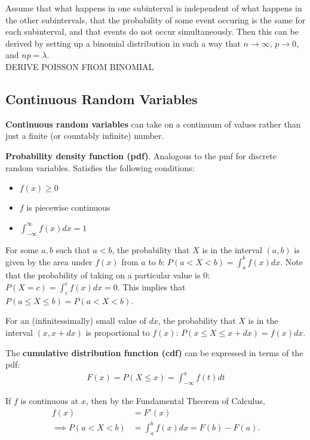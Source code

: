 \documentclass[a4paper,10pt]{article}
\begin{document}
Assume that what happens in one subinterval is independent of what happens in the other subintervals, that the probability of some event occuring is the same for each subinterval, and that events do not occur simultaneously. Then this can be derived by setting up a binomial distribution in such a way that $n \to \infty$, $p\to 0$, and $np=\lambda$. \\

{\Huge DERIVE POISSON FROM BINOMIAL} 

\subsection{Continuous Random Variables}

\textbf{Continuous random variables} can take on a continuum of values rather than just a finite (or countably infinite) number. 

\textbf{Probability density function (pdf)}. Analogous to the pmf for discrete random variables. Satisfies the following conditions:

\begin{itemize}
    \item $f(x) \geq 0$
    \item $f$ is piecewise continuous 
    \item $\int_{-\infty}^{\infty} f(x)dx = 1$
\end{itemize}

For some $a, b$ such that $a<b$, the probability that $X$ is in the interval $(a, b)$ is given by the area under $f(x)$ from $a$ to $b$: $P(a < X < b) = \int_a^b f(x)dx$. Note that the probability of taking on a particular value is 0: $P(X=c) = \int_c^c f(x)dx = 0$. This implies that $P(a\leq X\leq b) = P(a<X<b)$.

For an (infinitessimally) small value of $dx$, the probability that $X$ is in the interval $(x, x+dx)$ is proportional to $f(x)$: $P(x\leq X\leq x+dx) = f(x)dx$. 

The \textbf{cumulative distribution function (cdf)} can be expressed in terms of the pdf: 
\begin{align*}
    F(x) = P(X\leq x) = \int_{-\infty}^x f(t)dt
\end{align*}

If $f$ is continuous at $x$, then by the Fundamental Theorem of Calculus, 
\begin{align*}
    f(x) &= F'(x) \\
    \implies P(a < X < b) &= \int_a^b f(x)dx = F(b) - F(a).
\end{align*}
\end{document}
